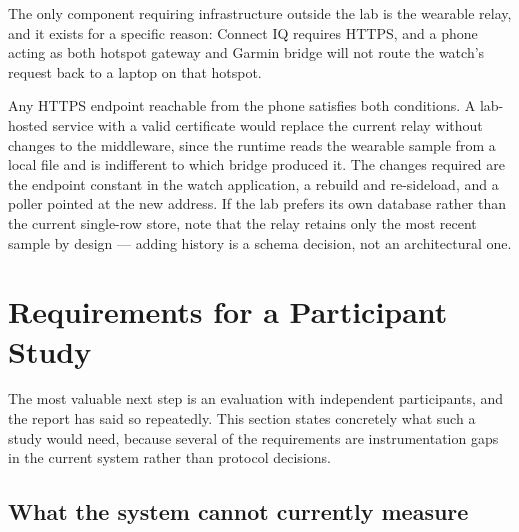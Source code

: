 \documentclass[11pt,a4paper]{article}
\begin{document}
The only component requiring infrastructure outside the lab is the wearable
relay, and it exists for a specific reason: Connect IQ requires HTTPS, and a
phone acting as both hotspot gateway and Garmin bridge will not route the
watch's request back to a laptop on that hotspot.

Any HTTPS endpoint reachable from the phone satisfies both conditions. A
lab-hosted service with a valid certificate would replace the current relay
without changes to the middleware, since the runtime reads the wearable sample
from a local file and is indifferent to which bridge produced it. The changes
required are the endpoint constant in the watch application, a rebuild and
re-sideload, and a poller pointed at the new address. If the lab prefers its own
database rather than the current single-row store, note that the relay retains
only the most recent sample by design --- adding history is a schema decision,
not an architectural one.

\section{Requirements for a Participant Study}
\label{sec:studyreqs}

The most valuable next step is an evaluation with independent participants, and
the report has said so repeatedly. This section states concretely what such a
study would need, because several of the requirements are instrumentation gaps
in the current system rather than protocol decisions.

\subsection{What the system cannot currently measure}
\end{document}

